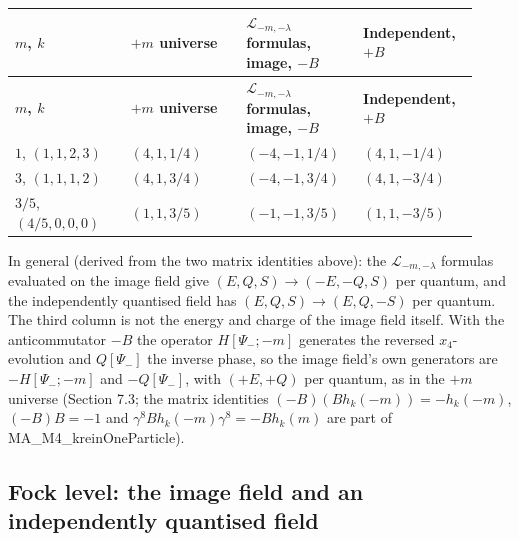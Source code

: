\documentclass[11pt]{article}
\begin{document}
\begin{longtable}{@{}p{0.230\linewidth}p{0.230\linewidth}p{0.230\linewidth}p{0.230\linewidth}@{}}
\toprule
\textbf{$m$, $k$} & \textbf{$+m$ universe} & \textbf{$\mathcal L_{-m,-\lambda}$ formulas, image, $-B$} & \textbf{Independent, $+B$} \\
\midrule
\endfirsthead
\toprule
\textbf{$m$, $k$} & \textbf{$+m$ universe} & \textbf{$\mathcal L_{-m,-\lambda}$ formulas, image, $-B$} & \textbf{Independent, $+B$} \\
\midrule
\endhead
$1$, $(1,1,2,3)$ & $(4,1,1/4)$ & $(-4,-1,1/4)$ & $(4,1,-1/4)$ \\
$3$, $(1,1,1,2)$ & $(4,1,3/4)$ & $(-4,-1,3/4)$ & $(4,1,-3/4)$ \\
$3/5$, $(4/5,0,0,0)$ & $(1,1,3/5)$ & $(-1,-1,3/5)$ & $(1,1,-3/5)$ \\
\bottomrule
\end{longtable}

In general (derived from the two matrix identities above): the $\mathcal L_{-m,-\lambda}$ formulas evaluated on the image field give $(E,Q,S)\to(-E,-Q,S)$ per quantum, and the independently quantised field has $(E,Q,S)\to(E,Q,-S)$ per quantum. The third column is not the energy and charge of the image field itself. With the anticommutator $-B$ the operator $H[\Psi_-;-m]$ generates the reversed $x_4$-evolution and $Q[\Psi_-]$ the inverse phase, so the image field's own generators are $-H[\Psi_-;-m]$ and $-Q[\Psi_-]$, with $(+E,+Q)$ per quantum, as in the $+m$ universe (Section 7.3; the matrix identities $(-B)(Bh_k(-m))=-h_k(-m)$, $(-B)B=-1$ and $\gamma^8Bh_k(-m)\gamma^8=-Bh_k(m)$ are part of MA\_M4\_kreinOneParticle).

\subsection{Fock level: the image field and an independently quantised field}
\end{document}
